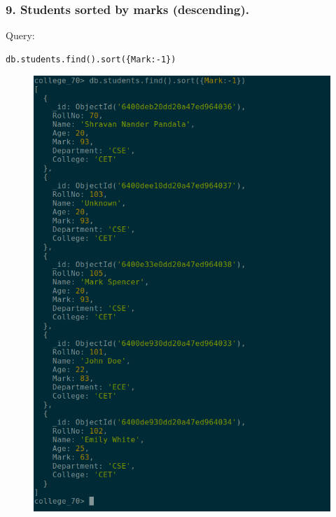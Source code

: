 \documentclass{article}
\begin{document}
\subsubsection*{9. Students sorted by marks (descending).}
Query:
\begin{Verbatim}[frame=single,framerule=1pt,fontfamily=courier,fontsize=\small]
db.students.find().sort({Mark:-1})
\end{Verbatim}
\begin{figure}[H]
    \centering
    \includegraphics[width=\textwidth]{cycle7/7.9.png}
\end{figure}
\end{document}
